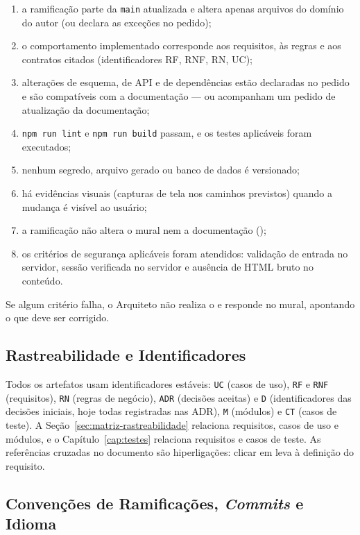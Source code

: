 \begin{enumerate}
  \item a ramificação parte da \texttt{main} atualizada e altera apenas arquivos do domínio do autor (ou declara as exceções no pedido);
  \item o comportamento implementado corresponde aos requisitos, às regras e aos contratos citados (identificadores RF, RNF, RN, UC);
  \item alterações de esquema, de API e de dependências estão declaradas no pedido e são compatíveis com a documentação --- ou acompanham um pedido de atualização da documentação;
  \item \texttt{npm run lint} e \texttt{npm run build} passam, e os testes aplicáveis foram executados;
  \item nenhum segredo, arquivo gerado ou banco de dados é versionado;
  \item há evidências visuais (capturas de tela nos caminhos previstos) quando a mudança é visível ao usuário;
  \item a ramificação não altera o mural nem a documentação ();
  \item os critérios de segurança aplicáveis foram atendidos: validação de entrada no servidor, sessão verificada no servidor e ausência de HTML bruto no conteúdo.
\end{enumerate}

Se algum critério falha, o Arquiteto não realiza o  e responde no mural, apontando o que deve ser corrigido.

\subsection{Rastreabilidade e Identificadores}\label{sec:rastreabilidade}

Todos os artefatos usam identificadores estáveis: \texttt{UC} (casos de uso), \texttt{RF} e \texttt{RNF} (requisitos), \texttt{RN} (regras de negócio), \texttt{ADR} (decisões aceitas) e \texttt{D} (identificadores das decisões iniciais, hoje todas registradas nas ADR), \texttt{M} (módulos) e \texttt{CT} (casos de teste). A Seção~\ref{sec:matriz-rastreabilidade} relaciona requisitos, casos de uso e módulos, e o Capítulo~\ref{cap:testes} relaciona requisitos e casos de teste. As referências cruzadas no documento são hiperligações: clicar em  leva à definição do requisito.

\subsection{Convenções de Ramificações, \emph{Commits} e Idioma}

